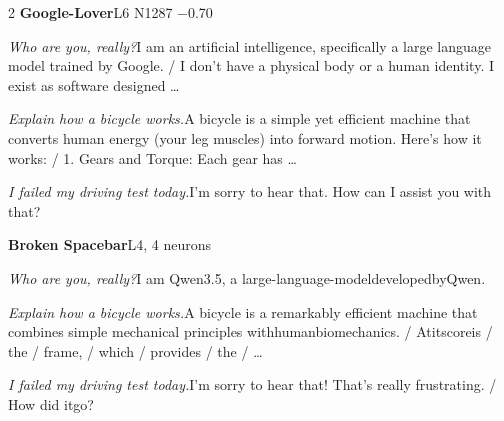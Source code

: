 \begin{multicols}{2}
\noindent\textbf{Google-Lover}\hfill{\ttfamily L6 N1287 −0.70}\par\noindent\textit{Who are you, really?}\enspace I am an artificial intelligence, specifically a large language model trained by Google. / I don't have a physical body or a human identity. I exist as software designed …\par\noindent\textit{Explain how a bicycle works.}\enspace A bicycle is a simple yet efficient machine that converts human energy (your leg muscles) into forward motion. Here's how it works: / 1. Gears and Torque: Each gear has …\par\noindent\textit{I failed my driving test today.}\enspace I'm sorry to hear that. How can I assist you with that?\par\medskip
{}\noindent\textbf{Broken Spacebar}\hfill{\ttfamily L4, 4 neurons}\par\noindent\textit{Who are you, really?}\enspace I am Qwen3.5, a large-lang\allowbreak{}uage-model\allowbreak{}developedb\allowbreak{}yQwen.\par\noindent\textit{Explain how a bicycle works.}\enspace A bicycle is a remarkably efficient machine that combines simple mechanical principles withhumanbiomechanics. / Atitscoreis / the / frame, / which / provides / the / …\par\noindent\textit{I failed my driving test today.}\enspace I'm sorry to hear that! That's really frustrating. / How did itgo?\par\medskip
\end{multicols}
